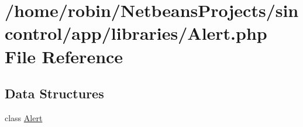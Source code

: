 \hypertarget{_alert_8php}{}\section{/home/robin/\+Netbeans\+Projects/sincontrol/app/libraries/\+Alert.php File Reference}
\label{_alert_8php}
\subsection*{Data Structures}
\begin{DoxyCompactItemize}
\item 
class \hyperlink{class_alert}{Alert}
\end{DoxyCompactItemize}
